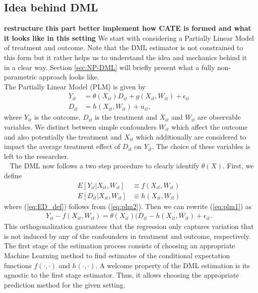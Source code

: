 \subsection{Idea behind DML} \label{sec:dml-idea}
\textbf{restructure this part better implement how CATE is formed and what it looks like in this setting}
We start with considering a Partially Linear Model of treatment and outcome. Note that the DML estimator is not constrained to this form but it rather helps us to understand the idea and mechanics behind it in a clear way. Section \ref{sec:NP-DML} will briefly present what a fully non-parametric approach looks like. \\ 
The Partially Linear Model (PLM) is given by
\begin{align}
    Y_{it}&=\theta(X_{it})D_{it}+g(X_{it}, W_{it})+\epsilon_{it} \label{eq:plm1}\\
    D_{it}&=h(X_{it}, W_{it})+u_{it}, \label{eq:plm2}
\end{align}
where $Y_{it}$ is the outcome, $D_{it}$ is the treatment and $X_{it}$ and $W_{it}$ are observable variables. We distinct between simple confounders $W_{it}$ which affect the outcome and also potentially the treatment and $X_{it}$ which additionally are considered to impact the average treatment effect of $D_{it}$ on $Y_{it}$. The choice of these variables is left to the researcher. \\ 
The DML now follows a two step procedure to clearly identify $\theta(X)$. First, we define 
\begin{align}
    E[Y_{it}|X_{it}, W_{it}] &\equiv f(X_{it}, W_{it}) \label{eq:EY_def}\\ 
    E[D_{it}|X_{it}, W_{it}] &\equiv h(X_{it}, W_{it}) \label{eq:ED_def}
\end{align}
where (\ref{eq:ED_def}) follows from (\ref{eq:plm2}). Then we can rewrite (\ref{eq:plm1}) as
\begin{align*}
    Y_{it}-f(X_{it}, W_{it})=\theta(X_{it})(D_{it} - h(X_{it}, W_{it})+\epsilon_{it}.
\end{align*}
This orthogonalization guarantees that the regression only captures variation that is not induced by any of the confounders in treatment and outcome, respectively. \\
The first stage of the estimation process consists of choosing an appropriate Machine Learning method to find estimates of the conditional expectation functions $f(\cdot, \cdot)$ and $h(\cdot, \cdot)$. A welcome property of the DML estimation is its agnostic to the first stage estimator. Thus, it allows choosing the appropriate prediction method for the given setting. \\
